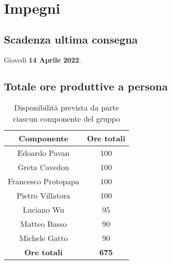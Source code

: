 \section{Impegni}
\subsection{Scadenza ultima consegna}
Giovedì \textbf{14 Aprile 2022}.
\subsection{Totale ore produttive a persona}
\begin{center}
\begin{table}[!htbp]
	\centering
    \begin{tabular}{c|c}
	\toprule
    \textbf{Componente} & \textbf{Ore totali} \\
    \midrule
    \rowcolor{gray!10} Edoardo Pavan & 100 \\ 
    \hline
    Greta Cavedon & 100 \\ 
    \hline
    \rowcolor{gray!10} Francesco Protopapa &  100 \\
    \hline
    Pietro Villatora &  100 \\
    \hline
    \rowcolor{gray!10}  Luciano Wu & 95\\
    \hline
    Matteo Basso &  90\\
    \hline
    \rowcolor{gray!10}  Michele Gatto & 90\\
    \hline \hline
    \textbf{Ore totali} & \textbf{675}  \\
    \bottomrule
    
    \end{tabular}
    \caption{Disponibilità prevista da parte ciascun componente del gruppo}
\end{table}
\end{center}

